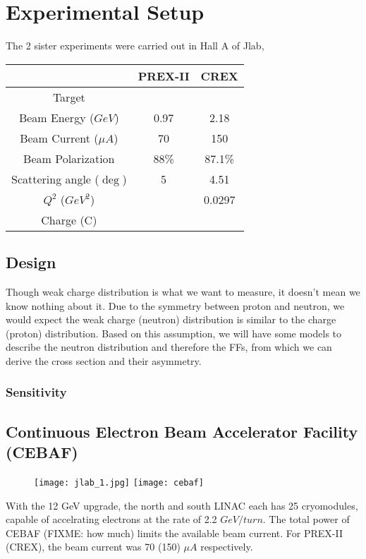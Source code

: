 \section{Experimental Setup}
The 2 sister experiments were carried out in Hall A of Jlab, 

\begin{table}
    \centering
    \begin{tabular}{c | c c }
	\hline
	&   PREX-II & CREX  \\
	\hline
	Target	& \Pb	& \Ca	\\
	Beam Energy ($GeV$) & 0.97 & 2.18  \\
	Beam Current ($\mu A$)	& 70	& 150	\\
	Beam Polarization & 88\%   & 87.1\%   \\
	Scattering angle ($\deg$)   & 5	& 4.51 \\
	$Q^2$ ($GeV^2$)	&   & 0.0297	\\
	\hline
	Charge (C)  &	&   \\
	\hline
    \end{tabular}
\end{table}

\subsection{Design}
Though weak charge distribution is what we want to measure, it doesn't mean we
know nothing about it. Due to the symmetry between proton and neutron, we would
expect the weak charge (neutron) distribution is similar to the charge (proton)
distribution. Based on this assumption, we will have some models to describe
the neutron distribution and therefore the FFs, from which we can derive the
cross section and their asymmetry.

\subsubsection{Sensitivity}

\subsection{Continuous Electron Beam Accelerator Facility (CEBAF)}
\begin{figure}
    \texttt{[image: jlab\_1.jpg]}
    \texttt{[image: cebaf]}
\end{figure}
With the 12 GeV upgrade, the north and south LINAC each has 25 cryomodules, 
capable of accelrating electrons at the rate of 2.2 $GeV/turn$. The total power
of CEBAF (FIXME: how much) limits the available beam current. For PREX-II (CREX), 
the beam current was 70 (150) $\mu A$ respectively.


